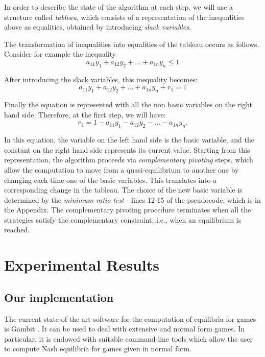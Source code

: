 \documentclass[11pt]{article}
\begin{document}
In order to describe the state of the algorithm at each step, we
will use a structure called {\em tableau}, which consists of a
representation of the inequalities above as equalities, obtained by
introducing {\em slack variables}.

The transformation of inequalities into equalities of the tableau
occurs as follows. Consider for example the inequality
\begin{equation*}
a_{11} y_1 + a_{12} y_2 + \dots + a_{1n} y_n \le 1
\end{equation*}

After introducing the slack variables, this inequality becomes:
\begin{equation*}
a_{11} y_1 + a_{12} y_2 + \dots + a_{1n} y_n + r_1 = 1
\end{equation*}

Finally the equation is represented with all the non basic variables
on the right hand side. Therefore, at the first step, we will have:
\begin{equation*}
r_1 = 1 - a_{11} y_1 - a_{12} y_2 - \dots - a_{1n} y_n.
\end{equation*}

In this equation, the variable on the left hand side is the basic
variable, and the constant on the right hand side represents its
current value. Starting from this representation, the algorithm
proceeds via {\em complementary pivoting} steps, which allow the
computation to move from a quasi-equilibrium to another one by
changing each time one of the basic variables. This translates into
a corresponding change in the tableau. The choice of the new basic
variable is determined by the {\em minimum ratio test} - lines
12-15 of the pseudocode, which is in the Appendix.
The complementary pivoting procedure terminates
when all the strategies satisfy the complementary constraint, i.e.,
when an equilibrium is reached.

\section{Experimental Results}
\label{expres}

\subsection{Our implementation}
The current state-of-the-art software for the computation of
equilibria for games is Gambit \cite{gamb}. It can be used to deal
with extensive and normal form games. In particular, it is endowed
with suitable command-line tools which allow the user to compute
Nash equilibria for games given in normal form.
\end{document}
